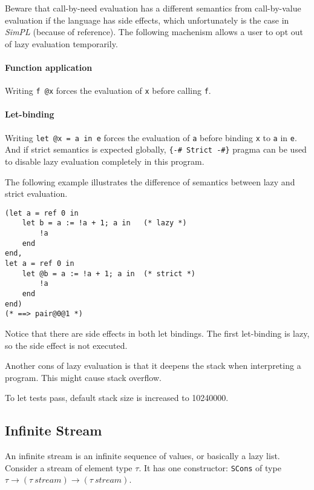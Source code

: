 \documentclass[a4paper]{article}
\begin{document}
Beware that call-by-need evaluation has a different semantics from call-by-value evaluation if the language has side effects, which unfortunately is the case in \textit{SimPL} (because of reference). The following machenism allows a user to opt out of lazy evaluation temporarily.

\paragraph{Function application} Writing \texttt{f @x} forces the evaluation of \texttt{x} before calling \texttt{f}.
\paragraph{Let-binding} Writing \texttt{let @x = a in e} forces the evaluation of \texttt{a} before binding \texttt{x} to \texttt{a} in \texttt{e}.\mbox{}\\

And if strict semantics is expected globally, \texttt{\{-\# Strict -\#\}} pragma can be used to disable lazy evaluation completely in this program.

The following example illustrates the difference of semantics between lazy and strict evaluation.

\begin{verbatim}
(let a = ref 0 in
    let b = a := !a + 1; a in   (* lazy *)
        !a
    end
end,
let a = ref 0 in
    let @b = a := !a + 1; a in  (* strict *)
        !a
    end
end)
(* ==> pair@0@1 *)
\end{verbatim}

Notice that there are side effects in both let bindings. The first let-binding is lazy, so the side effect is not executed.

Another cons of lazy evaluation is that it deepens the stack when interpreting a program. This might cause stack overflow.

To let tests pass, default stack size is increased to 10240000.

\subsection{Infinite Stream}

An infinite stream is an infinite sequence of values, or basically a lazy list.
Consider a stream of element type $\tau$. It has one constructor: \texttt{SCons} of type $\tau \to (\tau\ stream) \to (\tau\ stream)$.
\end{document}
